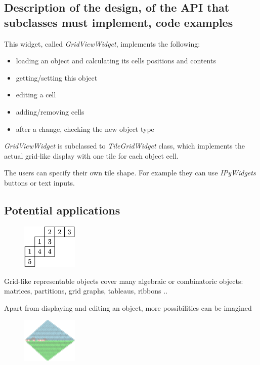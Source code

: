 \documentclass{deliverablereport}
\begin{document}
\subsection{Description of the design, of the API that subclasses must
  implement, code examples}

This widget, called \emph{GridViewWidget}, implements the following:

\begin{itemize}
 \item loading an object and calculating its cells positions and
   contents
 \item getting/setting this object
 \item editing a cell
 \item adding/removing cells
 \item after a change, checking the new object type
\end{itemize}

\emph{GridViewWidget} is subclassed to \emph{TileGridWidget} class,
which implements the actual grid-like display with one tile for each
object cell.

The users can specify their own tile shape. For example they can
use \emph{IPyWidgets} buttons or text inputs.

\subsection{Potential applications}

\begin{figure}
    \begin{center}
      \includegraphics[width=100px]{images/JDTSlide}
\end{center}
\end{figure}

Grid-like representable objects cover many algebraic or combinatoric
objects: matrices, partitions, grid graphs, tableaus, ribbons ..

Apart from displaying and editing an object, more possibilities can be
imagined


\begin{figure}
    \begin{center}
      \includegraphics[width=100px]{images/dominos-azteque}
\end{center}
\end{figure}
\end{document}
